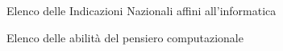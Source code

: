 \documentclass[12pt]{report}
\begin{document}
\begin{figure}[H]
	\centering
	 \label{indicazioniNazionali}
	\caption{Elenco delle Indicazioni Nazionali affini all'informatica}
\end{figure}


\begin{figure}[H]
	\centering
	\caption{Elenco delle abilità del pensiero computazionale}
	\label{App_CT}
\end{figure}
\end{document}
